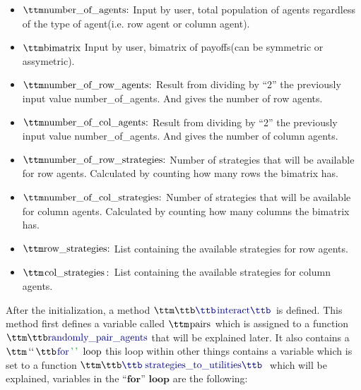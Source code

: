 \begin{itemize}
\item $\pythoninline{ number\_of\_agents:}$ Input by user, total population of agents regardless of the type of agent(i.e. row agent or column agent).
\item $\pythoninline{bimatrix}$ Input by user, bimatrix of payoffs(can be symmetric or assymetric).
\item $\pythoninline{number\_of\_row\_agents:}$ Result from dividing by “2” the previously input value number\_of\_agents. And gives the number of row agents.
\item $\pythoninline{number\_of\_col\_agents:}$ Result from dividing by “2” the previously input value number\_of\_agents. And gives the number of column agents.
\item $\pythoninline{number\_of\_row\_strategies:}$ Number of strategies that will be available for row agents. Calculated by counting how many rows the bimatrix has.
\item $\pythoninline{number\_of\_col\_strategies:}$ Number of strategies that will be available for column agents. Calculated by counting how many columns the bimatrix has.
\item $\pythoninline{row\_strategies:}$ List containing the available strategies for row agents.
\item $\pythoninline{col\_strategies:}$ List containing the available strategies for column agents.
\end{itemize}

After the initialization, a method $\pythoninline{interact}$ is defined. This method first defines a variable called $\pythoninline{pairs}$ which is assigned to a function $\pythoninline{randomly\_pair\_agents}$ that will be explained later. It also contains a $\pythoninline{``for'' loop}$ this loop within other things contains a variable which is set to a function $\pythoninline{strategies\_to\_utilities}$ which will be explained, variables in the $\textbf{``for'' loop}$ are the following:

